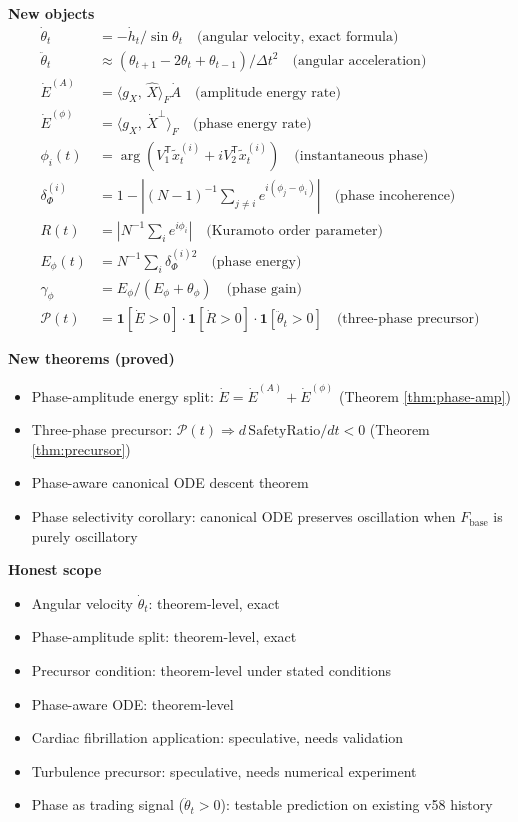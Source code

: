 \documentclass[11pt,a4paper]{article}
\theoremstyle{definition}
\newcommand{\T}{^{\mathsf{T}}}
\newcommand{\inner}[2]{\langle #1,\,#2\rangle}
\newcommand{\Fbase}{F_{\mathrm{base}}}
\newcommand{\gX}{g_X}
\begin{document}
\begin{resultbox}
\textbf{New objects}
\begin{align*}
\dot\theta_t &= -\dot h_t/\sin\theta_t \quad\text{(angular velocity, exact formula)} \\
\ddot\theta_t &\approx (\theta_{t+1}-2\theta_t+\theta_{t-1})/\Delta t^2 \quad\text{(angular acceleration)} \\
\dot E^{(A)} &= \inner{\gX}{\hat X}_F\dot A \quad\text{(amplitude energy rate)} \\
\dot E^{(\phi)} &= \inner{\gX}{\dot X^\perp}_F \quad\text{(phase energy rate)} \\
\phi_i(t) &= \arg(V_1\T\tilde x_t^{(i)} + iV_2\T\tilde x_t^{(i)}) \quad\text{(instantaneous phase)} \\
\delta_\Phi^{(i)} &= 1 - \left|(N-1)^{-1}\textstyle\sum_{j\neq i}e^{i(\phi_j-\phi_i)}\right| \quad\text{(phase incoherence)} \\
R(t) &= \left|N^{-1}\textstyle\sum_i e^{i\phi_i}\right| \quad\text{(Kuramoto order parameter)} \\
E_\phi(t) &= N^{-1}\textstyle\sum_i\delta_\Phi^{(i)2} \quad\text{(phase energy)} \\
\gamma_\phi &= E_\phi/(E_\phi+\theta_\phi) \quad\text{(phase gain)} \\
\mathcal{P}(t) &= \mathbf{1}[\dot E>0]\cdot\mathbf{1}[\dot R>0]\cdot\mathbf{1}[\ddot\theta_t>0] \quad\text{(three-phase precursor)}
\end{align*}

\textbf{New theorems (proved)}
\begin{itemize}
\item Phase-amplitude energy split: $\dot E = \dot E^{(A)} + \dot E^{(\phi)}$ (Theorem \ref{thm:phase-amp})
\item Three-phase precursor: $\mathcal{P}(t) \Rightarrow d\,\mathrm{SafetyRatio}/dt < 0$ (Theorem \ref{thm:precursor})
\item Phase-aware canonical ODE descent theorem
\item Phase selectivity corollary: canonical ODE preserves oscillation when $\Fbase$ is purely oscillatory
\end{itemize}

\textbf{Honest scope}
\begin{itemize}
\item Angular velocity $\dot\theta_t$: theorem-level, exact
\item Phase-amplitude split: theorem-level, exact
\item Precursor condition: theorem-level under stated conditions
\item Phase-aware ODE: theorem-level
\item Cardiac fibrillation application: speculative, needs validation
\item Turbulence precursor: speculative, needs numerical experiment
\item Phase as trading signal ($\ddot\theta_t > 0$): testable prediction on existing v58 history
\end{itemize}
\end{resultbox}
\end{document}
